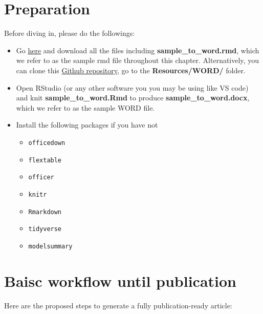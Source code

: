 \documentclass[
  letterpaper,
  DIV=11,
  numbers=noendperiod]{scrreprt}
\providecommand{\tightlist}{%
  \setlength{\itemsep}{0pt}\setlength{\parskip}{0pt}}\usepackage{longtable,booktabs,array}
\begin{document}
\hypertarget{preparation}{%
\section{Preparation}\label{preparation}}

Before diving in, please do the followings:

\begin{itemize}
\item
  Go
  \href{https://www.dropbox.com/sh/kamcegpis7m0pzq/AAAdZ2eo1vhaZ7srxDLNHdMoa?dl=0}{here}
  and download all the files including \textbf{sample\_to\_word.rmd},
  which we refer to as the sample rmd file throughout this chapter.
  Alternatively, you can clone this
  \href{https://github.com/tmieno2/WritingJournalArticleRmarkdown}{Github
  repository}, go to the \textbf{Resources/WORD/} folder.
\item
  Open RStudio (or any other software you you may be using like VS code)
  and knit \textbf{sample\_to\_word.Rmd} to produce
  \textbf{sample\_to\_word.docx}, which we refer to as the sample WORD
  file.
\item
  Install the following packages if you have not

  \begin{itemize}
  \tightlist
  \item
    \texttt{officedown}
  \item
    \texttt{flextable}
  \item
    \texttt{officer}
  \item
    \texttt{knitr}
  \item
    \texttt{Rmarkdown}
  \item
    \texttt{tidyverse}
  \item
    \texttt{modelsummary}
  \end{itemize}
\end{itemize}

\hypertarget{baisc-workflow-until-publication}{%
\section{Baisc workflow until
publication}\label{baisc-workflow-until-publication}}

Here are the proposed steps to generate a fully publication-ready
article:
\end{document}
